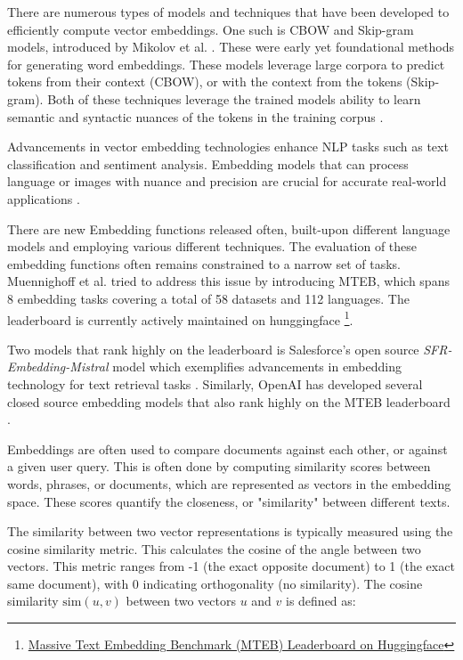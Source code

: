 


There are numerous types of models and techniques that have been developed to efficiently compute vector embeddings. One such is \gls{CBOW} and Skip-gram models, introduced by Mikolov et al. \cite{mikolov_efficient_2013}. These were early yet foundational methods for generating word embeddings. These models leverage large corpora to predict tokens from their context (CBOW), or with the context from the tokens (Skip-gram). Both of these techniques leverage the trained models ability to learn semantic and syntactic nuances of the tokens in the training corpus \cite{mikolov_efficient_2013, mikolov_distributed_2013}.


Advancements in vector embedding technologies enhance \gls{NLP} tasks such as text classification and sentiment analysis. Embedding models that can process language or images with nuance and precision are crucial for accurate real-world applications \cite{pennington_glove_2014}.


There are new Embedding functions released often, built-upon different language models and employing various different techniques. The evaluation of these embedding functions often remains constrained to a narrow set of tasks. Muennighoff et al. \cite{muennighoff_mteb_2023} tried to address this issue by introducing \gls{MTEB}, which spans 8 embedding tasks covering a total of 58 datasets and 112 languages. The leaderboard is currently actively maintained on hunggingface \footnote{\href{https://huggingface.co/spaces/mteb/leaderboard}{Massive Text Embedding Benchmark (MTEB) Leaderboard on Huggingface}}.


Two models that rank highly on the leaderboard is Salesforce's open source \textit{SFR-Embedding-Mistral} model which exemplifies advancements in embedding technology for text retrieval tasks \cite{meng_sfr-embedding-mistral_2024}. Similarly, OpenAI has developed several closed source embedding models that also rank highly on the MTEB leaderboard \cite{openai_new_2024, openai_new_2024-1}.


Embeddings are often used to compare documents against each other, or against a given user query. This is often done by computing similarity scores between words, phrases, or documents, which are represented as vectors in the embedding space. These scores quantify the closeness, or "similarity" between different texts.


The similarity between two vector representations is typically measured using the cosine similarity metric. This calculates the cosine of the angle between two vectors. This metric ranges from -1 (the exact opposite document) to 1 (the exact same document), with 0 indicating orthogonality (no similarity). The cosine similarity \( \text{sim}(u, v) \) between two vectors \( u \) and \( v \) is defined as:


